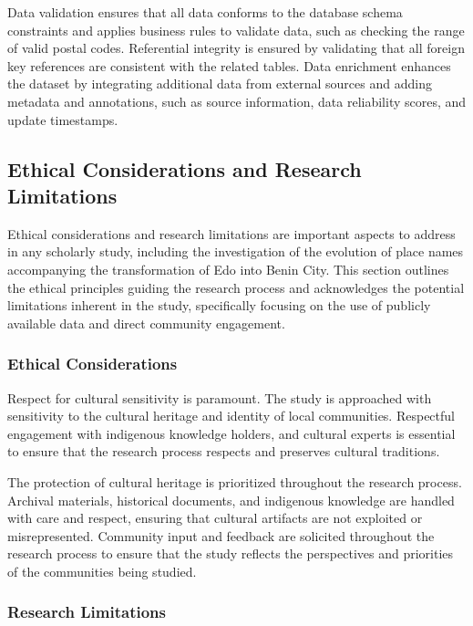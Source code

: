 Data validation ensures that all data conforms to the database schema constraints and applies business rules to validate data, such as checking the range of valid postal codes. Referential integrity is ensured by validating that all foreign key references are consistent with the related tables. Data enrichment enhances the dataset by integrating additional data from external sources and adding metadata and annotations, such as source information, data reliability scores, and update timestamps.


\subsection{Ethical Considerations and Research Limitations}

Ethical considerations and research limitations are important aspects to address in any scholarly study, including the investigation of the evolution of place names accompanying the transformation of Edo into Benin City. This section outlines the ethical principles guiding the research process and acknowledges the potential limitations inherent in the study, specifically focusing on the use of publicly available data and direct community engagement.

\subsubsection{Ethical Considerations}

Respect for cultural sensitivity is paramount. The study is approached with sensitivity to the cultural heritage and identity of local communities. Respectful engagement with indigenous knowledge holders, and cultural experts is essential to ensure that the research process respects and preserves cultural traditions. 

The protection of cultural heritage is prioritized throughout the research process. Archival materials, historical documents, and indigenous knowledge are handled with care and respect, ensuring that cultural artifacts are not exploited or misrepresented. Community input and feedback are solicited throughout the research process to ensure that the study reflects the perspectives and priorities of the communities being studied. 

\subsubsection{Research Limitations}

